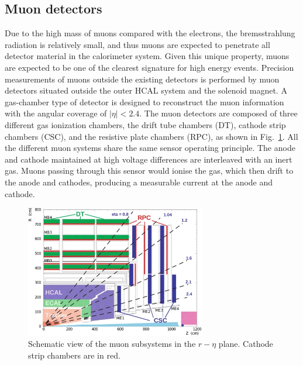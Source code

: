 \subsection{Muon detectors}
Due to the high mass of muons compared with the electrons, the bremsstrahlung radiation is relatively small, and thus muons are expected to penetrate all detector material in the calorimeter system.
Given this unique property, muons are expected to be one of the clearest signature for high energy events.
Precision measurements of muons outside the existing detectors is performed by muon detectors situated outside the outer HCAL system and the solenoid magnet.
A gas-chamber type of detector is designed to reconstruct the muon information with the angular coverage of $|\eta| < 2.4$.
The muon detectors are composed of three different gas ionization chambers, the drift tube chambers (DT), cathode strip chambers (CSC), and the resistive plate chambers (RPC), as shown in Fig.~\ref{fig:cms_muon}.
All the different muon systems share the same sensor operating principle.
The anode and cathode maintained at high voltage differences are interleaved with an inert gas.
Muons passing through this sensor would ionise the gas, which then drift to the anode and cathodes, producing a measurable current at the anode and cathode.
\begin{figure}\centering
    \includegraphics[width=0.7\textwidth]{figure/cms_muon.png}
    \caption[Schematic view of the muon subsystems in the $r-\eta$ plane.]
    {
        Schematic view of the muon subsystems in the $r-\eta$ plane. 
        Cathode strip chambers are in red.
    }
    \label{fig:cms_muon}
\end{figure}


